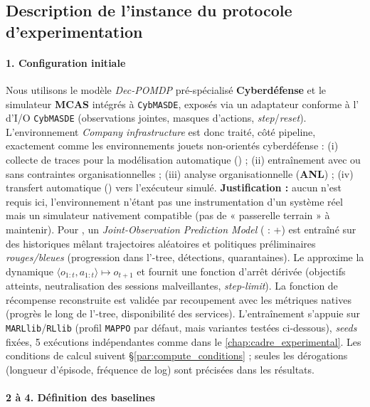 \subsection{Description de l'instance du protocole d'experimentation}

\paragraph{1. Configuration initiale}

Nous utilisons le modèle \emph{Dec-POMDP} pré-spécialisé \textbf{Cyberdéfense} et le simulateur \textbf{MCAS} intégrés à \texttt{CybMASDE}, exposés via un adaptateur  conforme à l’ d’I/O \texttt{CybMASDE} (observations jointes, masques d’actions, \emph{step}/\emph{reset}). L’environnement \emph{Company infrastructure} est donc traité, côté pipeline, exactement comme les environnements jouets non-orientés cyberdéfense : (i) collecte de traces pour la modélisation automatique (\texttt{}) ; (ii) entraînement  avec ou sans contraintes organisationnelles ; (iii) analyse organisationnelle (\textbf{ANL}) ; (iv) transfert automatique (\texttt{}) vers l’exécuteur simulé.
\textbf{Justification :} aucun \texttt{} n’est requis ici, l’environnement n’étant pas une instrumentation d’un système réel mais un simulateur nativement compatible (pas de « passerelle terrain » à maintenir).
Pour \texttt{}, un \emph{Joint-Observation Prediction Model} ( : +) est entraîné sur des historiques mêlant trajectoires aléatoires et politiques préliminaires \emph{rouges/bleues} (progression dans l’-tree, détections, quarantaines). Le  approxime la dynamique $\langle o_{1:t},a_{1:t} \rangle \mapsto o_{t+1}$ et fournit une fonction d’arrêt dérivée (objectifs atteints, neutralisation des sessions malveillantes, \emph{step-limit}). La fonction de récompense reconstruite est validée par recoupement avec les métriques natives (progrès le long de l’-tree, disponibilité des services). L’entraînement s’appuie sur \texttt{MARLlib}/\texttt{RLlib} (profil \texttt{MAPPO} par défaut, mais variantes testées ci-dessous), \emph{seeds} fixées, 5 exécutions indépendantes comme dans le \autoref{chap:cadre_experimental}. Les conditions de calcul suivent \S\ref{par:compute_conditions} ; seules les dérogations (longueur d’épisode, fréquence de log) sont précisées dans les résultats.

\paragraph{2 à 4. Définition des baselines}

